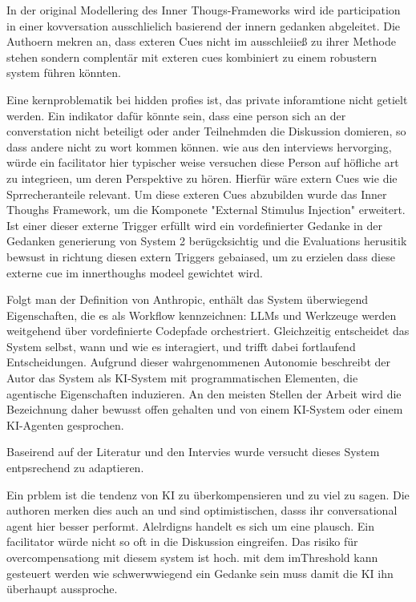 In der original Modellering des Inner Thougs-Frameworks wird ide participation in einer kovversation
ausschlielich basierend der innern gedanken abgeleitet. Die Authoern mekren an, dass exteren Cues nicht im
ausschleiieß zu ihrer Methode stehen sondern complentär mit exteren cues kombiniert zu einem robustern system
führen könnten. \cite[8.1 Proactive Agents via Intrinsic Motivation vs. Extrinsic
Cues]{liuProactiveConversationalAgents2025}

Eine kernproblematik bei hidden profies ist, das private inforamtione nicht getielt werden. Ein indikator
dafür könnte sein, dass eine person sich an der converstation nicht beteiligt oder ander Teilnehmden die
Diskussion domieren, so dass andere nicht zu wort kommen können. wie aus den interviews
hervorging, würde ein facilitator hier typischer weise versuchen diese Person auf höfliche art zu integrieen,
um deren Perspektive zu hören. Hierfür wäre extern Cues wie die Sprrecheranteile relevant. Um diese
exteren Cues abzubilden wurde das Inner Thoughs Framework, um die Komponete "External Stimulus Injection" erweitert.
Ist einer dieser externe Trigger erfüllt wird ein vordefinierter Gedanke in der Gedanken generierung von
System 2 berügcksichtig und die Evaluations herusitik bewsust in richtung diesen extern Triggers gebaiased,
um zu erzielen dass diese externe cue im innerthoughs modeel gewichtet wird.

Folgt man der Definition von Anthropic, enthält das System überwiegend Eigenschaften,
die es als Workflow kennzeichnen: LLMs und Werkzeuge werden weitgehend über vordefinierte Codepfade
orchestriert. Gleichzeitig entscheidet das System selbst, wann und wie es interagiert, und trifft dabei
fortlaufend Entscheidungen. Aufgrund dieser wahrgenommenen Autonomie beschreibt der Autor das System als
KI-System mit programmatischen Elementen, die agentische Eigenschaften induzieren. An den meisten Stellen
der Arbeit wird die Bezeichnung daher bewusst offen gehalten und von einem KI-System oder einem KI-Agenten
gesprochen.

Baseirend auf der Literatur und den Intervies wurde versucht dieses System entpsrechend zu adaptieren.

Ein prblem ist die tendenz von KI zu überkompensieren und zu viel zu sagen. Die authoren merken dies auch an
und sind optimistischen, dasss ihr conversational agent hier besser performt. Alelrdigns handelt es sich um
eine plausch. Ein facilitator würde nicht so oft in die Diskussion eingreifen. Das risiko für
overcompensationg mit diesem system ist hoch. mit dem imThreshold kann gesteuert werden wie schwerwwiegend
ein Gedanke sein muss damit die KI ihn überhaupt aussproche.

